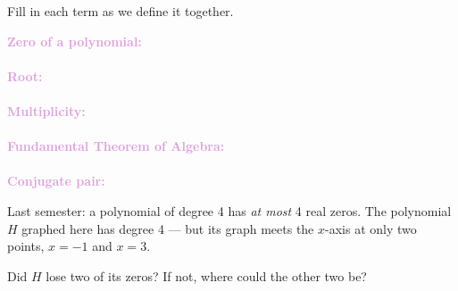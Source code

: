 \documentclass[10pt]{article}
\begin{document}

\vspace{0.12in}

\boxguard
\begin{vocabbox}
Fill in each term as we define it together.
\par\vspace{2pt}
\noindent\textbf{\textcolor{plum}{Zero of a polynomial:}}\\[1pt]
\writeline\\[3pt]
\noindent\textbf{\textcolor{plum}{Root:}}\\[1pt]
\writeline\\[3pt]
\noindent\textbf{\textcolor{plum}{Multiplicity:}}\\[1pt]
\writeline\\[3pt]
\noindent\textbf{\textcolor{plum}{Fundamental Theorem of Algebra:}}\\[1pt]
\writeline\\[3pt]
\noindent\textbf{\textcolor{plum}{Conjugate pair:}}\\[1pt]
\writeline
\end{vocabbox}

\vspace{0.1in}

\boxguard[18]
\begin{hookbox}
\begin{minipage}[c]{0.56\linewidth}
Last semester: a polynomial of degree 4 has \emph{at most} 4 real zeros. The polynomial $H$
graphed here has degree 4 --- but its graph meets the $x$-axis at only two points, $x = -1$
and $x = 3$.

\smallskip
Did $H$ lose two of its zeros? If not, where could the other two be?
\end{minipage}\hfill
\begin{minipage}[c]{0.4\linewidth}
\centering
{}
\end{minipage}
\par\vspace{2pt}
\end{hookbox}
\end{document}
